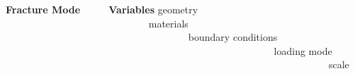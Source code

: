 \documentclass[first,firstsupp,lastsupp,last,hyperref,table]{ETHclass}
\begin{document}
\begin{frame}
\begin{columns}[t]
\begin{column}{0.5\textwidth}
\begin{alertblock}{\tiny\centering\textbf{Fracture Mode}}
\begin{columns}
\begin{column}{0.3\columnwidth}
\begin{tikzpicture}[scale=0.4]
\end{tikzpicture}
\end{column}
\end{columns}
\end{alertblock}
\end{column}
\begin{column}{0.5\textwidth}
\begin{alertblock}{\tiny\centering\textbf{Variables}}
\tiny\flushleft
geometry\\
\textcolor{white}{geometry}materials\\
\textcolor{white}{geometrymaterials}boundary conditions\\
\textcolor{white}{geometrymaterialsboundaryconditions}loading mode\\
\textcolor{white}{geometrymaterialsboundaryconditionsloadingmode}scale
\end{alertblock}
\end{column}
\end{columns}


\end{frame}
\end{document}
